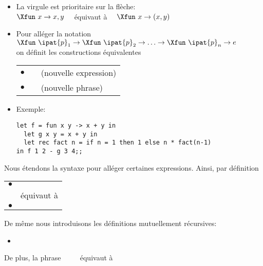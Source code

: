 \begin{itemize}

  \item La virgule est prioritaire sur la flèche:\\
        $\Xfun \,\, x \rightarrow x, y$ \ \ équivaut à \ \ 
        $\Xfun \,\, x \rightarrow (x,y)$

  \item Pour alléger la notation $\Xfun \,\, \ipat{p}_1 \rightarrow
  \Xfun \,\, \ipat{p}_2 \rightarrow \ldots \rightarrow \Xfun \,\,
  \ipat{p}_n \rightarrow e$\\
  on définit les constructions équivalentes

        \begin{tabular}{rll}
            $\bullet$
          & \phrase{$\Xlet \,\,
            \textrm{[}\Xrec\textrm{]} \,\, f 
            = \Xfun \,\, \ipat{p}_1 \, \ipat{p}_2 \, \underline{\ldots
            \, \ipat{p}_n} \rightarrow e$}
          & (nouvelle expression)\\
            $\bullet$
          & \phrase{$\Xlet \,\,
            \textrm{[}\Xrec\textrm{]} \,\, f 
            \,\, \ipat{p}_1 \, \ipat{p}_2 \, \underline{\ldots \,
            \ipat{p}_n} = e$}
          & (nouvelle phrase)
        \end{tabular}

  \item Exemple:
  {\small
   \begin{verbatim}
let f = fun x y -> x + y in
  let g x y = x + y in
  let rec fact n = if n = 1 then 1 else n * fact(n-1)
in f 1 2 - g 3 4;;
  \end{verbatim}
  }
  
\end{itemize}

Nous étendons la syntaxe pour alléger certaines expressions. Ainsi,
par définition

\begin{tabular}{rl}
    $\bullet$
  & \phrase{$\Xlet \,\, \ipat{p}_1 = e_1 \,\,
    \underline{\Xand \,\, \ipat{p}_2 = e_2 \, \ldots \,\,
    \Xand \,\, \ipat{p}_n = e_n} \,\, \Xin \,\, e$}\\
  & équivaut à\\
    $\bullet$
  & \phrase{$\Xlet \,\, (\ipat{p}_1, \ldots, \ipat{p}_n) =
    (e_1, \ldots, e_n) \,\, \Xin \,\, e$}
\end{tabular}

De même nous introduisons les définitions mutuellement récursives:
\begin{itemize}

  \item \phrase{$\Xlet \,\, \Xrec \,\, \ipat{p}_1 = e_1 \,\,
  \underline{\Xand \,\, \ipat{p}_2 = e_2 \, \ldots \,\, \Xand \,\,
  \ipat{p}_n = e_n} \,\, \Xin \,\, e$}

\end{itemize}
De plus, la phrase \ \  \ \, équivaut à \ \

